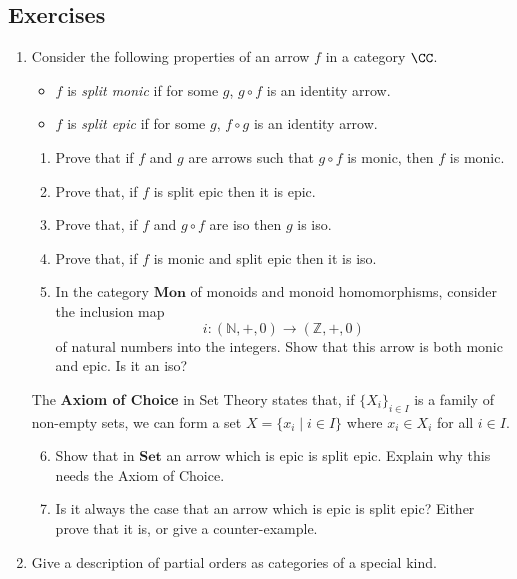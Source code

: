 \documentclass{svmult}
\begin{document}
\subsection{Exercises}
\begin{enumerate}\renewcommand{\theenumi}{\textbf{\arabic{enumi}}}
    \item Consider the following properties of an arrow $f$ in a category $\CC$.
    \begin{itemize}
        \item $f$ is \emph{split monic} if for some $g$, $g \circ f$ is an  identity arrow.
        \item $f$ is \emph{split epic} if for some $g$, $f \circ g$ is an  identity arrow.
    \end{itemize}
    \begin{enumerate}
        \item Prove that if $f$ and $g$ are arrows such that $g \circ f$ is monic, then $f$ is monic.
        \item Prove that, if $f$ is split epic then it is epic.
        \item Prove that, if $f$ and $g \circ f$ are iso then $g$ is iso.
        \item Prove that, if $f$ is monic and split epic then it is iso.
        \item In the category $\mathbf{Mon}$ of monoids and monoid homomorphisms, consider the inclusion map
        \[ i : (\mathbb{N},{+}, 0) \longrightarrow (\mathbb{Z}, {+}, 0) \]
        of natural numbers into the integers. Show that this arrow is both monic and epic. Is it an iso?
    \end{enumerate}
      The \textbf{Axiom of Choice} in Set Theory states that, if $\{ X_{i} \}_{i \in I}$ is a family of non-empty sets, we can form a set
      $X=\{ x_{i}\mid i\in I \}$ where $x_{i} \in X_{i}$ for all $i \in I$.
    \begin{enumerate}\setcounter{enumii}{5}
      \item Show that in $\mathbf{Set}$ an arrow which is epic is split epic. Explain why this needs the Axiom of Choice.
      \item Is it always the case that an arrow which is epic is split epic? Either prove that it is, or give a counter-example.
    \end{enumerate}
    \item Give a description of partial orders as categories of a special kind.
\end{enumerate}
\end{document}
